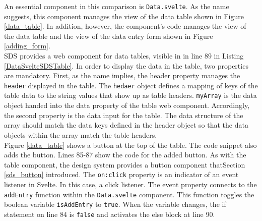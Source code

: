 An essential component in this comparison is \texttt{Data.svelte}. As the name suggests, this component manages the view of the data table shown in Figure \ref{data_table}. In addition, however, the component's code manages the view of the data table and the view of the data entry form shown in Figure \ref{adding_form}. \\

SDS provides a web component for data tables, visible in in line 89 in Listing \ref{DataSvelteSDSTable}. In order to display the data in the table, two properties are mandatory. 
First, as the name implies, the header property manages the \texttt{header} displayed in the table.  The \texttt{hedaer} object defines a mapping of keys of the table data to the string values that show up as table headers. \texttt{myArray} is the data object handed into the data property of the table web component. Accordingly, the second property is the data input for the table. The data structure of the array should match the data keys defined in the header object so that the data objects within the array match the table headers. \\
Figure \ref{data_table} shows a button at the top of the table. The code snippet also adds the button. Lines 85-87 show the code for the added button. As with the table component, the design system provides a button component thatSection \ref{sds_button} introduced. The \texttt{on:click} property is an indicator of an event listener in Svelte. In this case, a click listener. The event property connects to the \texttt{addEntry} function within the \texttt{Data.svelte} component. This function toggles the boolean variable \texttt{isAddEntry} to \texttt{true}. When the variable changes, the if statement on line 84 is \texttt{false} and activates the else block at line 90. \\

